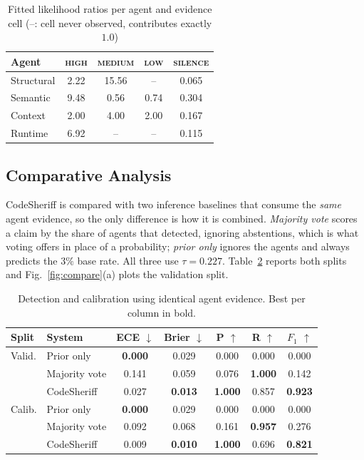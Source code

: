 \documentclass[conference]{IEEEtran}
\begin{document}
\begin{table}[t]
\centering
\caption{Fitted likelihood ratios per agent and evidence cell
(--: cell never observed, contributes exactly $1.0$)}
\label{tab:lr}
\small
\setlength{\tabcolsep}{5pt}
\begin{tabular}{lcccc}
\toprule
Agent & \textsc{high} & \textsc{medium} & \textsc{low} & \textsc{silence} \\
\midrule
Structural & 2.22 & 15.56 & --   & 0.065 \\
Semantic   & 9.48 & 0.56  & 0.74 & 0.304 \\
Context    & 2.00 & 4.00  & 2.00 & 0.167 \\
Runtime    & 6.92 & --    & --   & 0.115 \\
\bottomrule
\end{tabular}
\end{table}

\subsection{Comparative Analysis}
CodeSheriff is compared with two inference baselines that consume the
\emph{same} agent evidence, so the only difference is how it is combined.
\emph{Majority vote} scores a claim by the share of agents that detected,
ignoring abstentions, which is what voting offers in place of a
probability; \emph{prior only} ignores the agents and always predicts the
$3\%$ base rate. All three use $\tau=0.227$.
Table~\ref{tab:comparison} reports both splits and
Fig.~\ref{fig:compare}(a) plots the validation split.

\begin{table}[t]
\centering
\caption{Detection and calibration using identical agent evidence.
Best per column in bold.}
\label{tab:comparison}
\small
\setlength{\tabcolsep}{3.2pt}
\begin{tabular}{llccccc}
\toprule
Split & System & ECE $\downarrow$ & Brier $\downarrow$ & P $\uparrow$ & R $\uparrow$ & $F_1$ $\uparrow$ \\
\midrule
Valid.
 & Prior only        & \textbf{0.000} & 0.029 & 0.000 & 0.000 & 0.000 \\
 & Majority vote     & 0.141 & 0.059 & 0.076 & \textbf{1.000} & 0.142 \\
 & CodeSheriff       & 0.027 & \textbf{0.013} & \textbf{1.000} & 0.857 & \textbf{0.923} \\
\midrule
Calib.
 & Prior only        & \textbf{0.000} & 0.029 & 0.000 & 0.000 & 0.000 \\
 & Majority vote     & 0.092 & 0.068 & 0.161 & \textbf{0.957} & 0.276 \\
 & CodeSheriff       & 0.009 & \textbf{0.010} & \textbf{1.000} & 0.696 & \textbf{0.821} \\
\bottomrule
\end{tabular}
\end{table}
\end{document}
